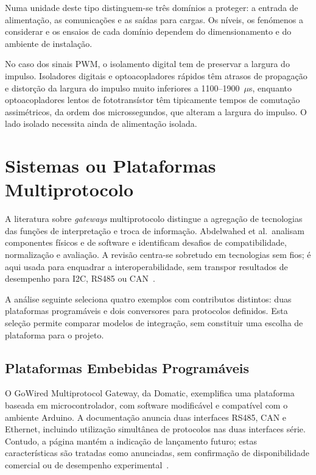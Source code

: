 Numa unidade deste tipo distinguem-se três domínios a proteger: a entrada
de alimentação, as comunicações e as saídas para cargas. Os níveis, os
fenómenos a considerar e os ensaios de cada domínio dependem do
dimensionamento e do ambiente de instalação.

No caso dos sinais PWM, o isolamento digital tem de preservar a largura do
impulso. Isoladores digitais e optoacopladores rápidos têm atrasos de
propagação e distorção da largura do impulso muito inferiores a
1100--1900~$\mu$s, enquanto optoacopladores lentos de fototransístor
têm tipicamente tempos de comutação assimétricos, da ordem dos
microssegundos, que alteram a largura do impulso. O lado isolado
necessita ainda de alimentação isolada.

\section{Sistemas ou Plataformas Multiprotocolo}

A literatura sobre \textit{gateways} multiprotocolo distingue a agregação
de tecnologias das funções de interpretação e troca de informação.
Abdelwahed et al.\ analisam componentes físicos e de software e
identificam desafios de compatibilidade, normalização e avaliação.
A revisão centra-se sobretudo em tecnologias sem fios; é aqui usada
para enquadrar a interoperabilidade, sem transpor resultados de
desempenho para I2C, RS485 ou CAN~\cite{abdelwahed_gateway_2025}.

A análise seguinte seleciona quatro exemplos com contributos distintos:
duas plataformas programáveis e dois conversores para protocolos
definidos. Esta seleção permite comparar modelos de integração, sem
constituir uma escolha de plataforma para o projeto.

\subsection{Plataformas Embebidas Programáveis}

O GoWired Multiprotocol Gateway, da Domatic, exemplifica uma plataforma
baseada em microcontrolador, com software modificável e compatível com
o ambiente Arduino. A documentação anuncia duas interfaces RS485, CAN
e Ethernet, incluindo utilização simultânea de protocolos nas duas
interfaces série. Contudo, a página mantém a indicação de lançamento
futuro; estas características são tratadas como anunciadas, sem
confirmação de disponibilidade comercial ou de desempenho
experimental~\cite{domatic_gowired}.

